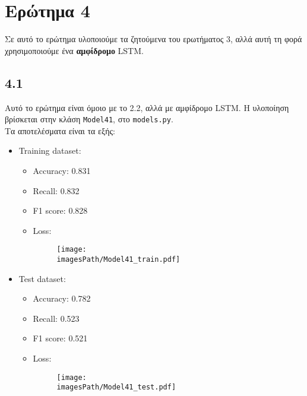 \documentclass[a4paper, 12pt]{article}
\newcommand{\imagesPath}{results}
\newcommand{\myWidth}{0.8\linewidth}
\begin{document}
\section*{Ερώτημα 4}
    
    Σε αυτό το ερώτημα υλοποιούμε τα ζητούμενα του ερωτήματος 3, αλλά αυτή τη φορά χρησιμοποιούμε ένα \textbf{αμφίδρομο} LSTM.  

    \subsection*{4.1} 

        Αυτό το ερώτημα είναι όμοιο με το 2.2, αλλά με αμφίδρομο LSTM. Η υλοποίηση βρίσκεται στην κλάση \verb|Model41|, στο \verb|models.py|. \\
        
        Τα αποτελέσματα είναι τα εξής:
        
        \begin{itemize}
            \item Training dataset:
                \begin{itemize}
                    \item Accuracy: 0.831 
                    \item Recall: 0.832 
                    \item F1 score: 0.828 
                    \item Loss:
                        \begin{figure}[H]
                            \centering
                            \texttt{[image: \\imagesPath/Model41\_train.pdf]}
                        \end{figure}
                \end{itemize}
                
            \item Test dataset:
                \begin{itemize}
                    \item Accuracy: 0.782 
                    \item Recall: 0.523 
                    \item F1 score: 0.521 
                    \item Loss:
                        \begin{figure}[H]
                            \centering
                            \texttt{[image: \\imagesPath/Model41\_test.pdf]}
                        \end{figure}
                \end{itemize}
        \end{itemize}
\end{document}
